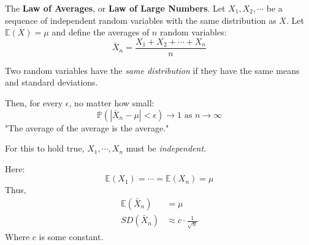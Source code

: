 \documentclass[titlepage, 12pt, leqno]{article}
\begin{document}
\begin{definition}
    The \textbf{Law of Averages}, or \textbf{Law of Large Numbers}. Let $X_1,X_2,
    \cdots $ be a sequence of independent random variables with the same 
    distribution as $X$. Let $ \mathbb{E}(X) = \mu$ and define the averages of
    $n$ random variables:
    \[
    \bar X_n = \frac{X_1+X_2+ \cdots + X_n}{n}    
    \]
    \begin{note}
        Two random variables have the \textit{same distribution} if they have the
        same means and standard deviations.
    \end{note}
    Then, for every $\epsilon$, no matter how small:
    \[
    \mathbb{P}(| \bar X_n - \mu | < \epsilon) \rightarrow 1 
    \text{ as } n \rightarrow \infty
    \]
    "The average of the average is the average."
    \begin{note}
        For this to hold true, $X_1, \cdots , X_n$ must be \textit{independent}.
    \end{note}
    Here:
    \[
    \mathbb{E}(X_1) = \cdots = \mathbb{E}(X_n) = \mu
    \]
    Thus,
    \begin{align*}
        \mathbb{E}( \bar X_n) &= \mu \\
        SD( \bar X_n) &\approx c \cdot \frac{1}{\sqrt{n}}
    \end{align*}
    Where $c$ is some constant.
\end{definition}
\end{document}
